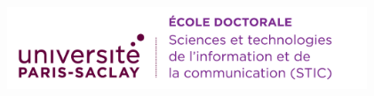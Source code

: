 \thispagestyle{empty}


\noindent 
\includegraphics[height=2.45cm]{logos/logo_usp_STIC}
\vspace{1cm}

